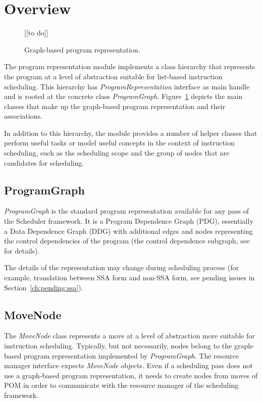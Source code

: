 \documentclass[a4paper,twoside]{tce}
\begin{document}
\section{Overview}

\begin{figure}[tb]
\centerline{[[to do]]}
\caption{Graph-based program representation.}
  \label{fig:program-overview}
\end{figure}
The program representation module implements a class hierarchy that
represents the program at a level of abstraction suitable for list-based
instruction scheduling. This hierarchy has \emph{ProgramRepresentation}
interface as main handle and is rooted at the concrete class
\emph{ProgramGraph}. Figure~\ref{fig:program-overview} depicts the main
classes that make up the graph-based program representation and their
associations.

In addition to this hierarchy, the module provides a number of helper
classes that perform useful tasks or model useful concepts in the context of
instruction scheduling, such as the scheduling scope and the group of nodes
that are candidates for scheduling.

\subsection{ProgramGraph}

\emph{ProgramGraph} is the standard program representation available for any
pass of the Scheduler framework. It is a Program Dependence Graph (PDG),
essentially a Data Dependence Graph (DDG) with additional edges and nodes
representing the control dependencies of the program (the control dependence
subgraph, see~\cite{Ferrante87} for details).

The details of the representation may change during scheduling process (for
example, translation between SSA form and non-SSA form, see pending issues
in Section~\ref{ch:pending:ssa}).

\subsection{MoveNode}
\label{ssec:MoveNode}

The \emph{MoveNode} class represents a move at a level of abstraction more
suitable for instruction scheduling. Typically, but not necessarily, nodes
belong to the graph-based program representation implemented by
\emph{ProgramGraph}. The resource manager interface expects \emph{MoveNode}
objects. Even if a scheduling pass does not use a graph-based program
representation, it needs to create nodes from moves of POM in order to
communicate with the resource manager of the scheduling framework.
\end{document}
